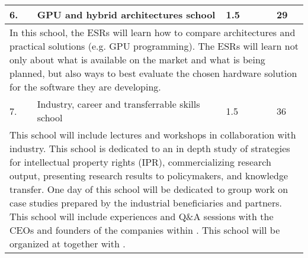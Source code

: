 \begin{center}
{\begin{tabular}{@{}lp{56mm}p{7mm}p{40mm}p{20mm}@{}}
			    			
				\cellcolor{yellow} 6. & GPU and hybrid architectures school & 1.5 & \santiagoentity  & 29 \tabularnewline \hline
				
				\multicolumn{5}{p{\textwidth}}{				
				
				In this school, the ESRs will learn how to compare architectures and practical
				solutions (e.g. GPU programming). The ESRs will learn not only about what is available on
				the market and what is being planned, but also ways to best evaluate the chosen hardware solution
				for the software they are developing.
				} \tabularnewline \hline\midrule				
				
				
				\cellcolor{green} 7. & Industry, career and transferrable skills school & 1.5 & \heidelbergentity  & 36 \tabularnewline \hline
				
				\multicolumn{5}{p{\textwidth}}{		
							
				This school will include lectures and workshops in collaboration with industry.
				This school is dedicated to an in depth study of strategies for intellectual property rights (IPR),
				commercializing research output, presenting research results to policymakers, and knowledge transfer.
				One day of this school will be dedicated to group work on case studies prepared by the industrial
				beneficiaries and partners. This school will include experiences and Q\&A sessions with the CEOs
				and founders of the companies within \acronym. This school will be organized at \heidelbergentity together with \dqentity. 
				} \tabularnewline \hline\midrule				
				

\end{tabular}}
\end{center}
